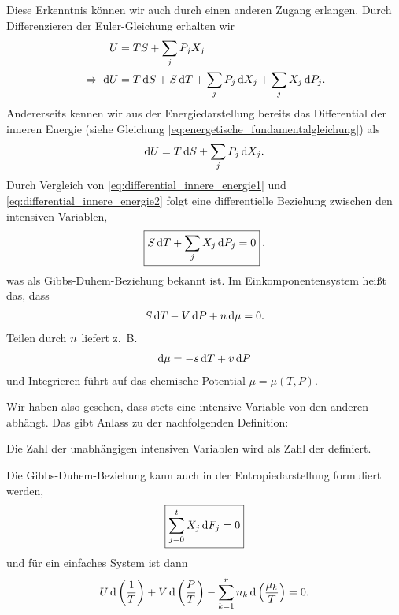 Diese Erkenntnis können wir auch durch einen anderen Zugang erlangen. Durch Differenzieren der Euler-Gleichung erhalten wir
\begin{align}
    U                    & =TS+ \sum_j P_jX_j                                                 \nonumber \\
    \label{eq:differential_innere_energie1}
    \;\Rightarrow\; \mathop{}\!\mathrm{d} U & = T\mathop{}\!\mathrm{d} S + S\mathop{}\!\mathrm{d} T + \sum_j P_j\mathop{}\!\mathrm{d} X_j + \sum_j X_j\mathop{}\!\mathrm{d} P_j.
\end{align}
Andererseits kennen wir aus der Energiedarstellung bereits das Differential der inneren Energie (siehe Gleichung \eqref{eq:energetische_fundamentalgleichung}) als
\begin{align}
    \label{eq:differential_innere_energie2}
    \mathop{}\!\mathrm{d} U = T\mathop{}\!\mathrm{d} S + \sum_j P_j \mathop{}\!\mathrm{d} X_j.
\end{align}
Durch Vergleich von \eqref{eq:differential_innere_energie1} und \eqref{eq:differential_innere_energie2} folgt eine differentielle Beziehung zwischen den intensiven Variablen,
\begin{align}
    \label{eq:gibbs_duhem}
    \boxed{
        S\mathop{}\!\mathrm{d} T + \sum_j X_j \mathop{}\!\mathrm{d} P_j = 0
    }\:,
\end{align}
was als Gibbs-Duhem-Beziehung bekannt ist.
Im Einkomponentensystem heißt das, dass
\begin{align*}
    S\mathop{}\!\mathrm{d} T - V\mathop{}\!\mathrm{d} P + n \mathop{}\!\mathrm{d} \mu = 0.
\end{align*}
Teilen durch $n$ liefert z.~B.
\begin{align*}
    \mathop{}\!\mathrm{d} \mu = -s \mathop{}\!\mathrm{d} T + v\mathop{}\!\mathrm{d} P
\end{align*}
und Integrieren führt auf das chemische Potential $\mu=\mu(T,P)$.

Wir haben also gesehen, dass stets eine intensive Variable von den anderen abhängt. Das gibt Anlass zu der nachfolgenden Definition:
\begin{formal}
    Die Zahl der unabhängigen intensiven Variablen wird als Zahl der  definiert.
\end{formal}

Die Gibbs-Duhem-Beziehung kann auch in der Entropiedarstellung formuliert werden,
\begin{align*}
    \boxed{\sum_{j=0}^t X_j \mathop{}\!\mathrm{d} F_j = 0}
\end{align*}
und für ein einfaches System ist dann
\begin{align}
    \label{eq:gibbs duhem einfaches system}
    U\mathop{}\!\mathrm{d}\left(\frac{1}{T}\right) + V\mathop{}\!\mathrm{d}\left(\frac{P}{T}\right)-\sum_{k=1}^r n_k\mathop{}\!\mathrm{d}\left(\frac{\mu_k}{T}\right)=0.
\end{align}


